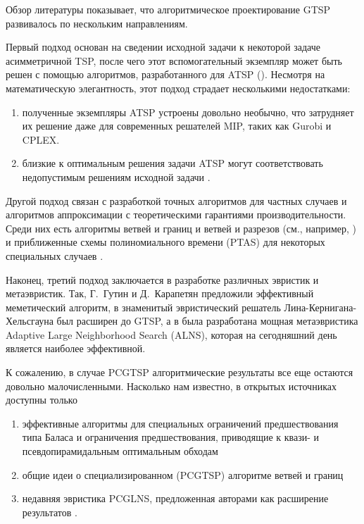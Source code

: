 Обзор литературы показывает,
что алгоритмическое проектирование GTSP развивалось по нескольким направлениям.

Первый подход основан на сведении исходной задачи к некоторой задаче асимметричной TSP,
после чего этот вспомогательный экземпляр может быть решен с помощью алгоритмов,
разработанного для ATSP
(\cite{LaporteSemet1999, NoonBean1993}).
Несмотря на математическую элегантность,
этот подход страдает несколькими недостатками:
\begin{enumerate}
\item
полученные экземпляры ATSP устроены довольно необычно,
что затрудняет их решение даже для современных решателей MIP,
таких как Gurobi и CPLEX.
\item
близкие к оптимальным решения задачи ATSP
могут соответствовать недопустимым решениям исходной задачи
\cite{KaraGut2012}.
\end{enumerate}

Другой подход связан с разработкой точных алгоритмов для частных случаев
и алгоритмов аппроксимации с теоретическими гарантиями производительности.
Среди них есть алгоритмы ветвей и границ и ветвей и разрезов
(см., например, \cite{FishGonToth1997, Yuan2020})
и приближенные схемы полиномиального времени (PTAS)
для некоторых специальных случаев
\cite{FerGriSit2006, KhN-PSIM2017}.

Наконец,
третий подход заключается в разработке
различных эвристик и метаэвристик.
Так, Г.~Гутин и Д.~Карапетян \cite{Gutin-2010}
предложили эффективный меметический алгоритм,
в \cite{Helsgaun-2015} знаменитый эвристический решатель
Лина-Кернигана-Хельсгауна был расширен до GTSP,
а в \cite{SMITH20171} была разработана мощная метаэвристика
Adaptive Large Neighborhood Search (ALNS),
которая на сегодняшний день является наиболее эффективной.

К сожалению, в случае PCGTSP
алгоритмические результаты все еще остаются довольно малочисленными.
Насколько нам известно, в открытых источниках доступны только
\begin{enumerate}
	\item
	эффективные алгоритмы для специальных ограничений предшествования типа Баласа
	\cite {Balas-Sim2001, ChenKhKh2016, CKK-IFAC2016}
	и ограничения предшествования, приводящие к квази- и псевдопирамидальным оптимальным обходам
	\cite{KhN-AMAI-2020}
	\item
	общие идеи о специализированном (PCGTSP) алгоритме ветвей и границ
	\cite{SALMAN2020163}
	\item
	недавняя эвристика PCGLNS, предложенная авторами
	\cite{KKP-optima2020}
	как расширение результатов
	\cite{SMITH20171}.
\end{enumerate}

